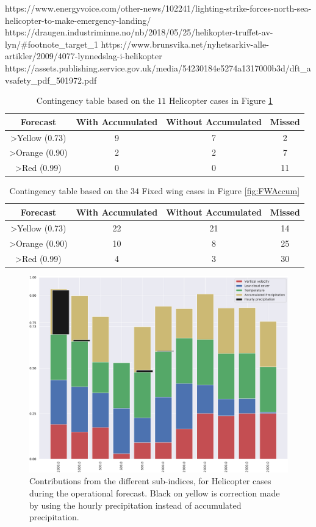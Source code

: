 https://www.energyvoice.com/other-news/102241/lighting-strike-forces-north-sea-helicopter-to-make-emergency-landing/
https://draugen.industriminne.no/nb/2018/05/25/helikopter-truffet-av-lyn/#footnote_target_1
https://www.brunsvika.net/nyhetsarkiv-alle-artikler/2009/4077-lynnedslag-i-helikopter
https://assets.publishing.service.gov.uk/media/54230184e5274a1317000b3d/dft_avsafety_pdf_501972.pdf

\begin{table}[H] 
    \centering
    \begin{tabular}{c|c|c|c}
        Forecast & With Accumulated & Without Accumulated & Missed \\ \hline
        >Yellow (0.73) & 9 & 7 & 2\\
        >Orange (0.90) & 2 & 2 & 7\\ 
        >Red (0.99) & 0 & 0 & 11\\
    \end{tabular}
    \caption{Contingency table based on the $11$ Helicopter cases in Figure \ref{fig:HeliAccum}}
    \label{tab:HeliCont}
\end{table}

\begin{table}[H]
    \centering
    \begin{tabular}{c|c|c|c}
        Forecast & With Accumulated & Without Accumulated & Missed \\ \hline
        >Yellow (0.73) & 22 & 21 & 14\\
        >Orange (0.90) & 10& 8& 25\\ 
        >Red (0.99) & 4& 3& 30\\
    \end{tabular}
    \caption{Contingency table based on the $34$ Fixed wing cases in Figure \ref{fig:FWAccum}}
    \label{tab:FWCont}
\end{table}


\begin{figure}[H]
    \centering
    \includegraphics[width=\textwidth]{Figures/HeliAccum.pdf}
    \caption{Contributions from the different sub-indices, for Helicopter cases during the operational forecast. Black on yellow is correction made by using the hourly precipitation instead of accumulated precipitation.}
    \label{fig:HeliAccum}
\end{figure}

